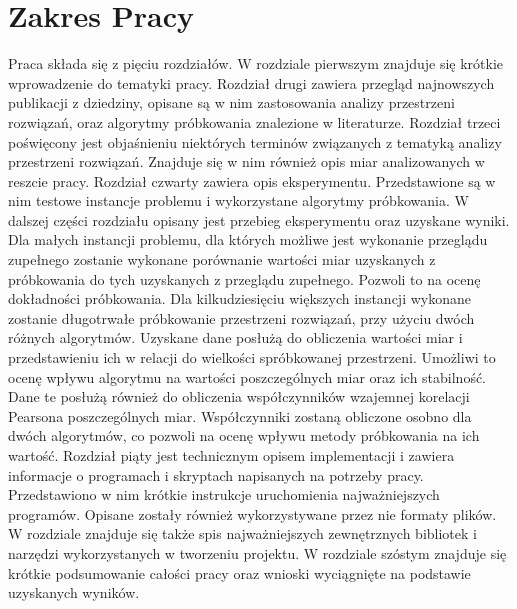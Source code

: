 \section{Zakres Pracy}

Praca składa się z pięciu rozdziałów.
W rozdziale pierwszym znajduje się krótkie wprowadzenie do tematyki pracy.
Rozdział drugi zawiera przegląd najnowszych publikacji z dziedziny, opisane są w nim zastosowania analizy przestrzeni rozwiązań, oraz algorytmy
próbkowania znalezione w literaturze.
Rozdział trzeci poświęcony jest objaśnieniu niektórych terminów związanych z tematyką
analizy przestrzeni rozwiązań. Znajduje się w nim również opis miar analizowanych w reszcie pracy.
Rozdział czwarty zawiera opis eksperymentu. Przedstawione są w nim testowe instancje problemu i wykorzystane algorytmy próbkowania.
W dalszej części rozdziału opisany jest przebieg eksperymentu oraz uzyskane wyniki.
Dla małych instancji problemu, dla których możliwe jest wykonanie przeglądu zupełnego zostanie wykonane porównanie wartości miar
uzyskanych z próbkowania do tych uzyskanych z przeglądu zupełnego. Pozwoli to na ocenę dokładności próbkowania.
Dla kilkudziesięciu większych instancji wykonane zostanie długotrwałe próbkowanie przestrzeni rozwiązań, przy użyciu dwóch różnych algorytmów.
Uzyskane dane posłużą do obliczenia wartości miar i przedstawieniu ich w relacji do wielkości spróbkowanej przestrzeni.
Umożliwi to ocenę wpływu algorytmu na wartości poszczególnych miar oraz ich stabilność.
Dane te posłużą również do obliczenia współczynników wzajemnej korelacji Pearsona poszczególnych miar.
Współczynniki zostaną obliczone osobno dla dwóch algorytmów, co pozwoli na ocenę wpływu metody próbkowania na ich wartość.
Rozdział piąty jest technicznym opisem implementacji i zawiera informacje o programach i skryptach napisanych na potrzeby pracy.
Przedstawiono w nim krótkie instrukcje uruchomienia najważniejszych programów. Opisane zostały również wykorzystywane przez nie formaty plików.
W rozdziale znajduje się także spis najważniejszych zewnętrznych bibliotek i narzędzi wykorzystanych w tworzeniu projektu.
W rozdziale szóstym znajduje się krótkie podsumowanie całości pracy oraz wnioski wyciągnięte na podstawie uzyskanych wyników.

